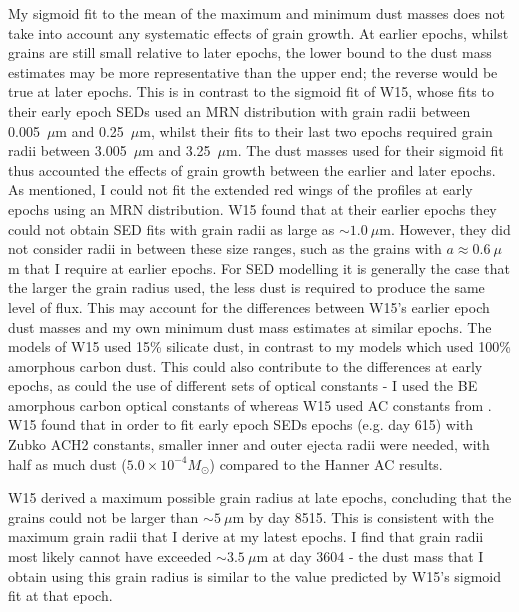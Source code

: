 My sigmoid fit to the mean of the maximum and 
minimum dust masses does not take into account any systematic effects of 
grain growth.  At earlier epochs, whilst grains are 
still small relative to later epochs, the lower bound to the dust mass 
estimates may be more representative than the upper end; the reverse would 
be true at later epochs.
This is in contrast to the sigmoid fit of W15, whose fits to their early 
epoch SEDs used an MRN distribution with grain radii between 0.005~$\mu$m 
and 0.25~$\mu$m, whilst their fits to their last two epochs required grain 
radii between 3.005~$\mu$m and 3.25~$\mu$m. The dust masses used for their 
sigmoid fit thus accounted the effects of grain growth between the earlier 
and later epochs. As mentioned, I could not fit the extended red wings of 
the profiles at early epochs using an MRN distribution.  W15 found that at 
their earlier epochs they could not obtain SED fits with grain radii as 
large as $\sim 1.0~\mu$m. However, they did not consider radii in between 
these size ranges, such as the grains with $a \approx 0.6~\mu$m that I 
require at earlier epochs.  For SED modelling it is generally the case that 
the larger the grain radius used, the less dust is required to produce the 
same level of flux.  This may account for the differences between W15's 
earlier epoch dust masses and my own minimum dust mass estimates at 
similar epochs.  The models of W15 used 15\% silicate dust, in contrast to 
my models which used 100\% amorphous carbon dust.  This could also 
contribute to the differences at early epochs, as could the use of 
different sets of optical constants - I used the BE amorphous carbon 
optical constants of \citet{Zubko1996} whereas W15 used AC constants from 
\citet{Hanner1988}.  W15 found that in order to fit early epoch SEDs epochs 
(e.g. day 615) with Zubko ACH2 constants, smaller inner and outer ejecta 
radii were needed, with half as much dust ($5.0 \times 10^{-4}M_{\odot}$) 
compared to the Hanner AC results.

W15 derived a maximum possible grain radius at late epochs, concluding that 
the grains could not be larger than $\sim 5~\mu$m by day 8515. This is 
consistent with the maximum grain radii that I derive at my latest 
epochs.  I find that grain radii most likely cannot have exceeded $\sim 
3.5~\mu$m at day 3604 - the dust mass that I obtain using this grain 
radius is similar to the value predicted by W15's sigmoid fit at that 
epoch.

